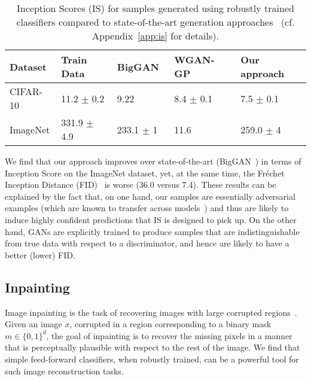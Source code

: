 \documentclass{article}
\begin{document}
{\renewcommand{\arraystretch}{1}\begin{table}[!h]
	\caption{Inception Scores (IS) for samples generated using robustly trained
	classifiers compared to state-of-the-art 
	generation approaches~\cite{gulrajani2017improved,shmelkov2018good, brock2019large} (cf. Appendix~\ref{app:is} 
	for details).}
\begin{tabular}{P{2.3cm}|P{2.3cm}P{2.3cm}P{2.35cm}P{2.6cm} }
	\toprule
    Dataset & Train Data & BigGAN~\cite{brock2019large} &
        WGAN-GP~\cite{gulrajani2017improved} & {Our approach} \\
	\midrule
	CIFAR-10   & 11.2 $\pm$ 0.2    & 9.22 &    8.4 $\pm$ 0.1 & {7.5 $\pm$ 0.1} \\
	ImageNet\footnotemark &   331.9 $\pm$ 4.9  & 233.1 $\pm$ 1    & 11.6 & {259.0 $\pm$ 4} \\
	\bottomrule
\end{tabular}
\label{tab:inception_score}
\end{table}

We find that our approach improves over state-of-the-art
(BigGAN~\cite{brock2019large}) in
terms of Inception Score on the ImageNet dataset, yet, at the same time, the
Fr\'echet Inception Distance (FID)~\cite{heusel2017gans} is worse
(36.0 versus 7.4). These results can be explained by the fact that, on one hand, our samples are essentially adversarial examples (which are
known to transfer across models~\cite{szegedy2014intriguing}) and thus are likely
to induce highly confident predictions that IS is designed to pick up. On the other hand, GANs are explicitly trained to produce samples that are indistinguishable from true data with respect to a discriminator, and hence are likely to have a better (lower) FID.





 
\subsection{Inpainting}
\label{sec:inpainting}
Image inpainting is the task of recovering images with large 
corrupted regions~\cite{efros1999texture,bertalmio2000image,hays2007scene}.
Given an image $x$, corrupted in a region 
corresponding to a binary mask $m \in \{0, 1\}^d$, the goal 
of inpainting is to recover the missing pixels in a manner that is perceptually
plausible with respect to the rest of the image.
We find that simple feed-forward classifiers,
when robustly trained, can be a powerful tool for such image 
reconstruction tasks. 

}
\end{document}

